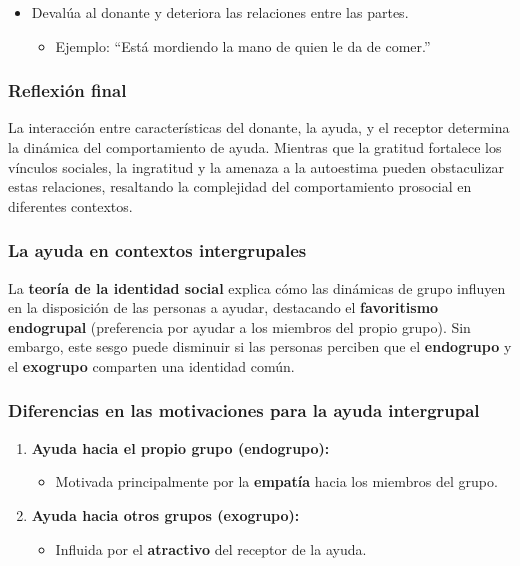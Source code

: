 \documentclass[
]{book}
\providecommand{\tightlist}{%
  \setlength{\itemsep}{0pt}\setlength{\parskip}{0pt}}
\begin{document}
\begin{itemize}
\tightlist
\item
  Devalúa al donante y deteriora las relaciones entre las partes.

  \begin{itemize}
  \tightlist
  \item
    Ejemplo: ``Está mordiendo la mano de quien le da de comer.''
  \end{itemize}
\end{itemize}

\subsubsection{Reflexión final}\label{reflexiuxf3n-final-1}

La interacción entre características del donante, la ayuda, y el receptor determina la dinámica del comportamiento de ayuda. Mientras que la gratitud fortalece los vínculos sociales, la ingratitud y la amenaza a la autoestima pueden obstaculizar estas relaciones, resaltando la complejidad del comportamiento prosocial en diferentes contextos.

\subsubsection{La ayuda en contextos intergrupales}\label{la-ayuda-en-contextos-intergrupales}

La \textbf{teoría de la identidad social} explica cómo las dinámicas de grupo influyen en la disposición de las personas a ayudar, destacando el \textbf{favoritismo endogrupal} (preferencia por ayudar a los miembros del propio grupo). Sin embargo, este sesgo puede disminuir si las personas perciben que el \textbf{endogrupo} y el \textbf{exogrupo} comparten una identidad común.

\subsubsection{Diferencias en las motivaciones para la ayuda intergrupal}\label{diferencias-en-las-motivaciones-para-la-ayuda-intergrupal}

\begin{enumerate}
\def\labelenumi{\arabic{enumi}.}
\tightlist
\item
  \textbf{Ayuda hacia el propio grupo (endogrupo):}

  \begin{itemize}
  \tightlist
  \item
    Motivada principalmente por la \textbf{empatía} hacia los miembros del grupo.
  \end{itemize}
\item
  \textbf{Ayuda hacia otros grupos (exogrupo):}

  \begin{itemize}
  \tightlist
  \item
    Influida por el \textbf{atractivo} del receptor de la ayuda.
  \end{itemize}
\end{enumerate}
\end{document}
